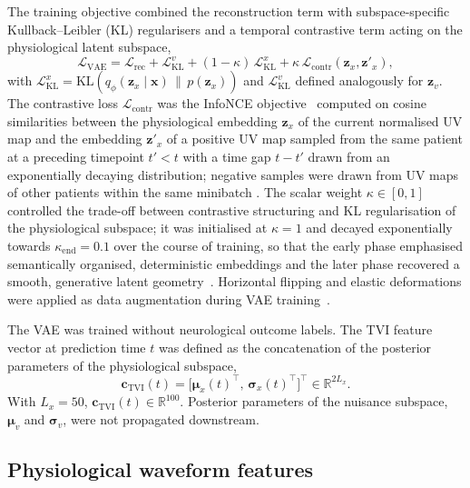\documentclass[11pt]{article}
\begin{document}
The training objective combined the reconstruction term with subspace-specific Kullback--Leibler (KL) regularisers and a temporal contrastive term acting on the physiological latent subspace,
\[
  \mathcal{L}_{\mathrm{VAE}} = \mathcal{L}_{\mathrm{rec}} + \mathcal{L}^{v}_{\mathrm{KL}} + (1-\kappa)\,\mathcal{L}^{x}_{\mathrm{KL}} + \kappa\,\mathcal{L}_{\mathrm{contr}}(\mathbf{z}_{x},\mathbf{z}'_{x}),
\]
with $\mathcal{L}^{x}_{\mathrm{KL}} = \mathrm{KL}\!\left(q_{\phi}(\mathbf{z}_{x}\mid\mathbf{x})\,\|\,p(\mathbf{z}_{x})\right)$ and $\mathcal{L}^{v}_{\mathrm{KL}}$ defined analogously for $\mathbf{z}_{v}$. The contrastive loss $\mathcal{L}_{\mathrm{contr}}$ was the InfoNCE objective~\citep{oord2018representation} computed on cosine similarities between the physiological embedding $\mathbf{z}_{x}$ of the current normalised UV map and the embedding $\mathbf{z}'_{x}$ of a positive UV map sampled from the same patient at a preceding timepoint $t'<t$ with a time gap $t-t'$ drawn from an exponentially decaying distribution; negative samples were drawn from UV maps of other patients within the same minibatch \cite{qian2021spatiotemporal}. The scalar weight $\kappa\in[0,1]$ controlled the trade-off between contrastive structuring and KL regularisation of the physiological subspace; it was initialised at $\kappa=1$ and decayed exponentially towards $\kappa_{\mathrm{end}}=0.1$ over the course of training, so that the early phase emphasised semantically organised, deterministic embeddings and the later phase recovered a smooth, generative latent geometry~\cite{geyer2025orthogonal, geyermeasuring}. Horizontal flipping and elastic deformations were applied as data augmentation during VAE training~\citep{ronneberger2015u}.

The VAE was trained without neurological outcome labels. The TVI feature vector at prediction time $t$ was defined as the concatenation of the posterior parameters of the physiological subspace,
\begin{equation}
  \label{eq:cTVI}
  \mathbf{c}_{\mathrm{TVI}}(t)=\bigl[\bm{\mu}_{x}(t)^{\top},\,\bm{\sigma}_{x}(t)^{\top}\bigr]^{\top}\in\mathbb{R}^{2L_{x}}.
\end{equation}
With $L_{x}=50$, $\mathbf{c}_{\mathrm{TVI}}(t)\in\mathbb{R}^{100}$. Posterior parameters of the nuisance subspace, $\bm{\mu}_{v}$ and $\bm{\sigma}_{v}$, were not propagated downstream.

\subsection*{Physiological waveform features}
\end{document}
